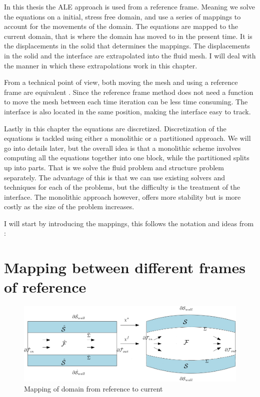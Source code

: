 In this thesis the ALE approach is used from a reference frame.
Meaning we solve the equations on a initial, stress free domain, and use a series of mappings to account for the movements of the domain. The equations are mapped to the current domain, that is where the domain has moved to in the present time. It is the displacements in the solid that determines the mappings. The displacements in the solid and the interface are extrapolated into the fluid mesh. I will deal with the manner in which these extrapolations work in this chapter. \newline

From a technical point of view, both moving the mesh and using a reference frame are equivalent \cite{Richter2016}. Since the reference frame method does not need a function to move the mesh between each time iteration can be less time consuming. The interface is also located in the same position, making the interface easy to track. \newline

Lastly in this chapter the equations are discretized. Discretization of the equations is tackled using either a monolithic or a partitioned approach. We will go into details later, but the overall idea is that a monolithic scheme involves computing all the equations together into one block, while the partitioned splits up into parts. That is we solve the fluid problem and structure problem separately. The advantage of this is that we can use existing solvers and techniques for each of the problems, but the difficulty is the treatment of the interface. The monolithic approach however, offers more stability but is more costly as the size of the problem increases\cite{Liu2014}. \newline

I will start by introducing the mappings, this follows the notation and ideas from \cite{Richter2016}:

\section{Mapping between different frames of reference}
\begin{figure}[H]
\label{pic:FSI_mapping}
\includegraphics[scale=0.45]{./FSI_ALE_formulation/FSI_mapping.png}
\caption{Mapping of domain from reference to current}
\end{figure}

